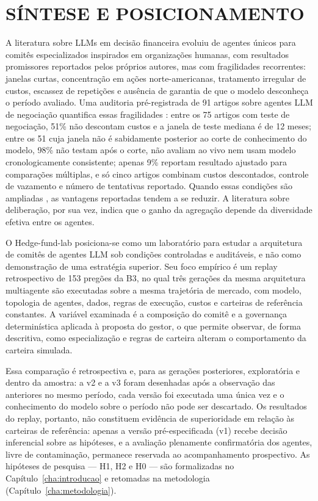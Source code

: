 \section{SÍNTESE E POSICIONAMENTO}

A literatura sobre LLMs em decisão financeira evoluiu de agentes únicos para comitês especializados inspirados em organizações humanas, com resultados promissores reportados pelos próprios autores, mas com fragilidades recorrentes: janelas curtas, concentração em ações norte-americanas, tratamento irregular de custos, escassez de repetições e ausência de garantia de que o modelo desconheça o período avaliado. Uma auditoria pré-registrada de 91 artigos sobre agentes LLM de negociação quantifica essas fragilidades \citep{Zhang2026}: entre os 75 artigos com teste de negociação, 51\% não descontam custos e a janela de teste mediana é de 12 meses; entre os 51 cuja janela não é sabidamente posterior ao corte de conhecimento do modelo, 98\% não testam após o corte, não avaliam ao vivo nem usam modelo cronologicamente consistente; apenas 9\% reportam resultado ajustado para comparações múltiplas, e só cinco artigos combinam custos descontados, controle de vazamento e número de tentativas reportado. Quando essas condições são ampliadas \citep{FINSABER2026}, as vantagens reportadas tendem a se reduzir. A literatura sobre deliberação, por sua vez, indica que o ganho da agregação depende da diversidade efetiva entre os agentes.

O Hedge-fund-lab posiciona-se como um laboratório para estudar a arquitetura de comitês de agentes LLM sob condições controladas e auditáveis, e não como demonstração de uma estratégia superior. Seu foco empírico é um replay retrospectivo de 153 pregões da B3, no qual três gerações da mesma arquitetura multiagente são executadas sobre a mesma trajetória de mercado, com modelo, topologia de agentes, dados, regras de execução, custos e carteiras de referência constantes. A variável examinada é a composição do comitê e a governança determinística aplicada à proposta do gestor, o que permite observar, de forma descritiva, como especialização e regras de carteira alteram o comportamento da carteira simulada.

Essa comparação é retrospectiva e, para as gerações posteriores, exploratória e dentro da amostra: a v2 e a v3 foram desenhadas após a observação das anteriores no mesmo período, cada versão foi executada uma única vez e o conhecimento do modelo sobre o período não pode ser descartado. Os resultados do replay, portanto, não constituem evidência de superioridade em relação às carteiras de referência: apenas a versão pré-especificada (v1) recebe decisão inferencial sobre as hipóteses, e a avaliação plenamente confirmatória dos agentes, livre de contaminação, permanece reservada ao acompanhamento prospectivo. As hipóteses de pesquisa --- H1, H2 e H0 --- são formalizadas no Capítulo~\ref{cha:introducao} e retomadas na metodologia (Capítulo~\ref{cha:metodologia}).
